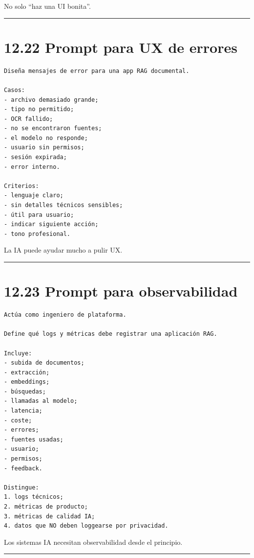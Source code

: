 No solo ``haz una UI bonita''.

\begin{center}\rule{0.5\linewidth}{0.5pt}\end{center}

\section{12.22 Prompt para UX de
errores}\label{prompt-para-ux-de-errores}

\begin{lstlisting}
Diseña mensajes de error para una app RAG documental.

Casos:
- archivo demasiado grande;
- tipo no permitido;
- OCR fallido;
- no se encontraron fuentes;
- el modelo no responde;
- usuario sin permisos;
- sesión expirada;
- error interno.

Criterios:
- lenguaje claro;
- sin detalles técnicos sensibles;
- útil para usuario;
- indicar siguiente acción;
- tono profesional.
\end{lstlisting}

La IA puede ayudar mucho a pulir UX.

\begin{center}\rule{0.5\linewidth}{0.5pt}\end{center}

\section{12.23 Prompt para
observabilidad}\label{prompt-para-observabilidad}

\begin{lstlisting}
Actúa como ingeniero de plataforma.

Define qué logs y métricas debe registrar una aplicación RAG.

Incluye:
- subida de documentos;
- extracción;
- embeddings;
- búsquedas;
- llamadas al modelo;
- latencia;
- coste;
- errores;
- fuentes usadas;
- usuario;
- permisos;
- feedback.

Distingue:
1. logs técnicos;
2. métricas de producto;
3. métricas de calidad IA;
4. datos que NO deben loggearse por privacidad.
\end{lstlisting}

Los sistemas IA necesitan observabilidad desde el principio.

\begin{center}\rule{0.5\linewidth}{0.5pt}\end{center}

